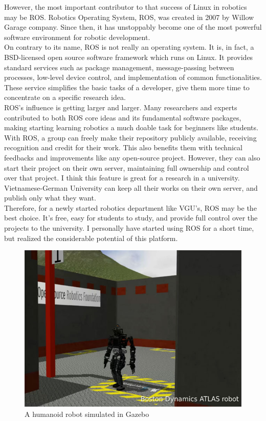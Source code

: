 \documentclass[pdftex,12pt,a4paper]{article}
\begin{document}
  However, the most important contributor to that success of Linux in robotics may be ROS. Robotics Operating System, ROS, was created in 2007 by Willow Garage company. Since then, it has unstoppably become one of the most powerful software environment for robotic development.\\
  On contrary to its name, ROS is not really an operating system. It is, in fact, a BSD-licensed open source software framework which runs on Linux. It provides standard  services such as package management, message-passing between processes, low-level device control, and implementation of common functionalities. These service simplifies the basic tasks of a developer, give them more time to concentrate on a specific research idea.\\
  ROS's influence is getting larger and larger. Many researchers and experts contributed to both ROS core ideas and its fundamental software packages, making starting learning robotics a much doable task for beginners like students.\\
  With ROS, a group can freely make their repository publicly available, receiving recognition and credit for their work. This also benefits them with technical feedbacks and improvements like any open-source project. However, they can also start their project on their own server, maintaining full ownership and control over that project. I think this feature is great for a research in a university. Vietnamese-German University can keep all their works on their own server, and publish only what they want.\\
  Therefore, for a newly started robotics department like VGU's, ROS may be the best choice. It's free, easy for students to study, and provide full control over the projects to the university. I personally have started using ROS for a short time, but realized the considerable potential of this platform.\par
  \begin{figure}[h]
      \centering
      \includegraphics[width=0.65\linewidth]{image/drc_gazebo-1370245661467-1370270174909.jpg}
      \caption{A humanoid robot simulated in Gazebo}
      \label{fig:gazebo_sample}
  \end{figure}
\end{document}
